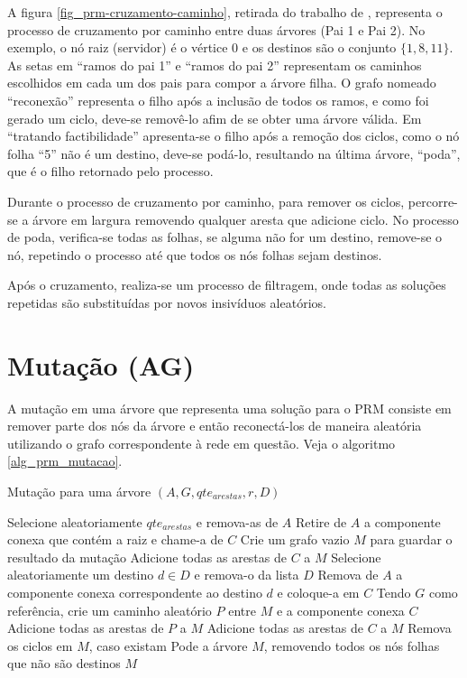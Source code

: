 A figura \ref{fig_prm-cruzamento-caminho}, retirada do trabalho de \cite{Lafeta2016}, representa o processo de cruzamento por caminho entre duas árvores (Pai 1 e Pai 2). No exemplo, o nó raiz (servidor) é o vértice 0 e os destinos são o conjunto $\{1, 8, 11\}$. As setas em ``ramos do pai 1'' e ``ramos do pai 2'' representam os caminhos escolhidos em cada um dos pais para compor a árvore filha. O grafo nomeado ``reconexão'' representa o filho após a inclusão de todos os ramos, e como foi gerado um ciclo, deve-se removê-lo afim de se obter uma árvore válida. Em ``tratando factibilidade'' apresenta-se o filho após a remoção dos ciclos, como o nó folha ``5'' não é um destino, deve-se podá-lo, resultando na última árvore, ``poda'', que é o filho retornado pelo processo.

Durante o processo de cruzamento por caminho, para remover os ciclos, percorre-se a árvore em largura removendo qualquer aresta que adicione ciclo. No processo de poda, verifica-se todas as folhas, se alguma não for um destino, remove-se o nó, repetindo o processo até que todos os nós folhas sejam destinos.

Após o cruzamento, realiza-se um processo de filtragem, onde todas as soluções repetidas são substituídas por novos insivíduos aleatórios.

\section{Mutação (AG)}

A mutação em uma árvore que representa uma solução para o PRM consiste em remover parte dos nós da árvore e então reconectá-los de maneira aleatória utilizando o grafo correspondente à rede em questão. Veja o algoritmo \ref{alg_prm_mutacao}.

\begin{algorithm}
	\caption{Mutação para uma árvore $(A, G, qte_{arestas}, r, D)$}
	\label{alg_prm_mutacao}
	\begin{algorithmic}[1]
		\State Selecione aleatoriamente $qte_{arestas}$ e remova-as de $A$
		\State Retire de $A$ a componente conexa que contém a raiz e chame-a de $C$
		\State Crie um grafo vazio $M$ para guardar o resultado da mutação
		\State Adicione todas as arestas de $C$ a $M$
			\State Selecione aleatoriamente um destino $d \in D$ e remova-o da lista $D$
			\State Remova de $A$ a componente conexa correspondente ao destino $d$ e coloque-a em $C$
				\State Tendo $G$ como referência, crie um caminho aleatório $P$ entre $M$ e a componente conexa $C$
				\State Adicione todas as arestas de $P$ a $M$
			\EndIf
			\State Adicione todas as arestas de $C$ a $M$
		\EndWhile
		\State Remova os ciclos em $M$, caso existam
		\State Pode a árvore $M$, removendo todos os nós folhas que não são destinos
		\State \Return $M$
	\end{algorithmic}
\end{algorithm}

